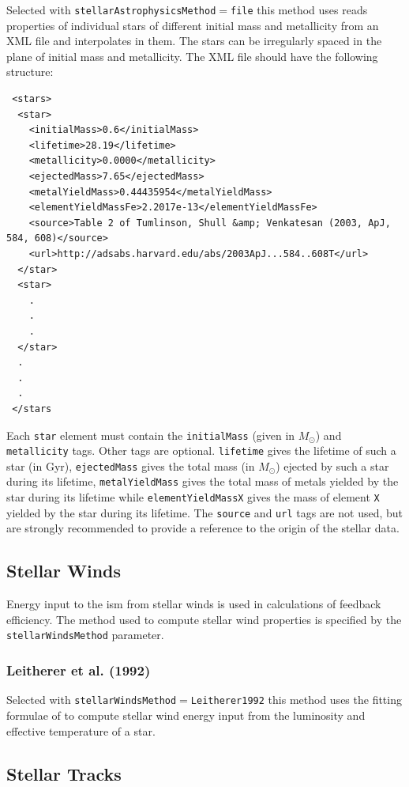 Selected with {\tt stellarAstrophysicsMethod}$=${\tt file} this method uses reads properties of individual stars of different initial mass and metallicity from an XML file and interpolates in them. The stars can be irregularly spaced in the plane of initial mass and metallicity. The XML file should have the following structure:
\begin{verbatim}
 <stars>
  <star>
    <initialMass>0.6</initialMass>
    <lifetime>28.19</lifetime>
    <metallicity>0.0000</metallicity>
    <ejectedMass>7.65</ejectedMass>
    <metalYieldMass>0.44435954</metalYieldMass>
    <elementYieldMassFe>2.2017e-13</elementYieldMassFe>
    <source>Table 2 of Tumlinson, Shull &amp; Venkatesan (2003, ApJ, 584, 608)</source>
    <url>http://adsabs.harvard.edu/abs/2003ApJ...584..608T</url>
  </star>
  <star>
    .
    .
    .
  </star>
  .
  .
  .
 </stars
\end{verbatim}
Each {\tt star} element must contain the {\tt initialMass} (given in $M_\odot$) and {\tt metallicity} tags. Other tags are optional. {\tt lifetime} gives the lifetime of such a star (in Gyr), {\tt ejectedMass} gives the total mass (in $M_\odot$) ejected by such a star during its lifetime, {\tt metalYieldMass} gives the total mass of metals yielded by the star during its lifetime while {\tt elementYieldMassX} gives the mass of element {\tt X} yielded by the star during its lifetime. The {\tt source} and {\tt url} tags are not used, but are strongly recommended to provide a reference to the origin of the stellar data.

\subsection{Stellar Winds}

Energy input to the \gls{ism} from stellar winds is used in calculations of feedback efficiency. The method used to compute stellar wind properties is specified by the {\tt stellarWindsMethod} parameter.

\subsubsection{Leitherer et al. (1992)}

Selected with {\tt stellarWindsMethod}$=${\tt Leitherer1992} this method uses the fitting formulae of \cite{leitherer_deposition_1992} to compute stellar wind energy input from the luminosity and effective temperature of a star.

\subsection{Stellar Tracks}

